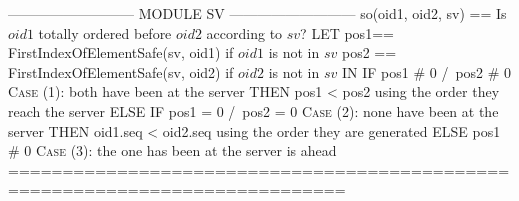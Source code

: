 \documentclass{article}
\begin{document}
\begin{tla}
--------------------------- MODULE SV ---------------------------
so(oid1, oid2, sv) == \* Is $oid1$ totally ordered before $oid2$ according to $sv$?
    LET  pos1== FirstIndexOfElementSafe(sv, oid1)  if $oid1$ is not in $sv$
        pos2 == FirstIndexOfElementSafe(sv, oid2)  if $oid2$ is not in $sv$
    IN  IF pos1 # 0 /\ pos2 # 0 \* \textsc{Case} (1): both have been at the server
        THEN pos1 < pos2        \* using the order they reach the server
        ELSE IF pos1 = 0 /\ pos2 = 0  \* \textsc{Case} (2): none have been at the server
             THEN oid1.seq < oid2.seq \* using the order they are generated
             ELSE pos1 # 0 \* \textsc{Case} (3): the one has been at the server is ahead
=============================================================================
\end{tla}
\end{document}
